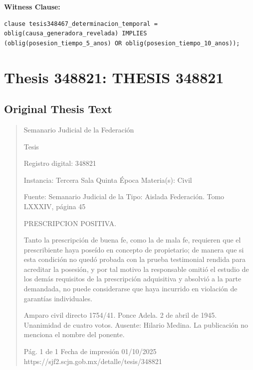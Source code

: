 \documentclass[11pt,a4paper]{article}
\begin{document}
\textbf{Witness Clause:}

\begin{lstlisting}[style=witnessstyle, language=Witness]
clause tesis348467_determinacion_temporal = oblig(causa_generadora_revelada) IMPLIES (oblig(posesion_tiempo_5_anos) OR oblig(posesion_tiempo_10_anos));
\end{lstlisting}

\newpage

\section{Thesis 348821: THESIS 348821}
\label{thesis:348821}

\subsection{Original Thesis Text}

\begin{quote}
                                                   Semanario Judicial de la Federación

                                                  Tesis

 Registro digital: 348821

 Instancia: Tercera Sala          Quinta Época                         Materia(s): Civil

                                  Fuente: Semanario Judicial de la     Tipo: Aislada
                                  Federación.
                                  Tomo LXXXIV, página 45


PRESCRIPCION POSITIVA.


Tanto la prescripción de buena fe, como la de mala fe, requieren que el prescribiente haya poseído
en concepto de propietario; de manera que si esta condición no quedó probada con la prueba
testimonial rendida para acreditar la posesión, y por tal motivo la responsable omitió el estudio de
los demás requisitos de la prescripción adquisitiva y absolvió a la parte demandada, no puede
considerarse que haya incurrido en violación de garantías individuales.


Amparo civil directo 1754/41. Ponce Adela. 2 de abril de 1945. Unanimidad de cuatro votos.
Ausente: Hilario Medina. La publicación no menciona el nombre del ponente.




                                             Pág. 1 de 1             Fecha de impresión 01/10/2025
  https://sjf2.scjn.gob.mx/detalle/tesis/348821

\end{quote}
\end{document}
